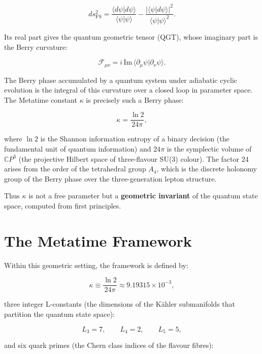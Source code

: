 \begin{equation}
ds_{\text{FS}}^2 = \frac{\langle d\psi|d\psi\rangle}{\langle\psi|\psi\rangle}
                 - \frac{|\langle\psi|d\psi\rangle|^2}{\langle\psi|\psi\rangle^2}.
\label{eq:fubini_study}
\end{equation}

Its real part gives the quantum geometric tensor (QGT), whose imaginary part
is the Berry curvature:

\[
\mathcal{F}_{\mu\nu} = i\,\text{Im}\,\langle\partial_\mu\psi|\partial_\nu\psi\rangle.
\]

The Berry phase accumulated by a quantum system under adiabatic cyclic
evolution is the integral of this curvature over a closed loop in parameter
space.  The Metatime constant \(\kappa\) is precisely such a Berry phase:

\[
\kappa = \frac{\ln 2}{24\pi},
\]

where \(\ln 2\) is the Shannon information entropy of a binary decision
(the fundamental unit of quantum information) and \(24\pi\) is the
symplectic volume of \(\mathbb{C}P^{3}\) (the projective Hilbert space of
three-flavour SU(3) colour).  The factor 24 arises from the order of the
tetrahedral group \(A_4\), which is the discrete holonomy group of the
Berry phase over the three-generation lepton structure.

Thus \(\kappa\) is not a free parameter but a \textbf{geometric invariant}
of the quantum state space, computed from first principles.

\section{The Metatime Framework}

Within this geometric setting, the framework is defined by:

\begin{equation}
\kappa \equiv \frac{\ln 2}{24\pi} \approx 9.19315 \times 10^{-3},
\label{eq:kappa_def}
\end{equation}

three integer L-constants (the dimensions of the K\"{a}hler submanifolds
that partition the quantum state space):

\begin{equation}
L_3 = 7,\qquad L_4 = 2,\qquad L_5 = 5,
\label{eq:L_defs}
\end{equation}

and six quark primes (the Chern class indices of the flavour fibres):

